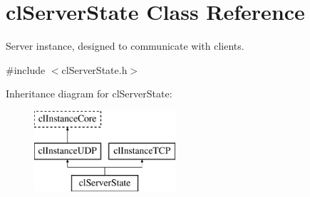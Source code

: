 \hypertarget{classcl_server_state}{
\section{clServerState Class Reference}
\label{classcl_server_state}
}


Server instance, designed to communicate with clients.  




{\ttfamily \#include $<$clServerState.h$>$}

Inheritance diagram for clServerState:\begin{figure}[H]
\begin{center}
\leavevmode
\includegraphics[height=3.000000cm]{classcl_server_state}
\end{center}
\end{figure}
